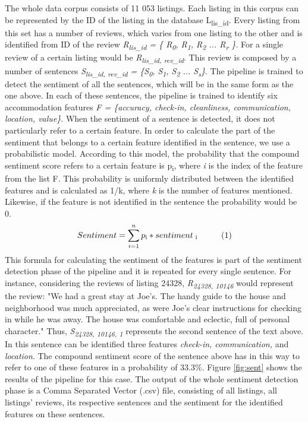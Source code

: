 The whole data corpus consists of 11 053 listings. Each listing in this corpus can be represented by the ID of the listing in the database L\textsubscript{lis\_id}. Every listing from this set has a number of reviews, which varies from one listing to the other and is identified from ID of the review \textit{R\textsubscript{lis\_id} = \{ R\textsubscript{0}, R\textsubscript{1},  R\textsubscript{2} ... R\textsubscript{r} \}}. For a single review of a certain listing would be \textit{R\textsubscript{lis\_id, rev\_id}}. This review is composed by a number of sentences \textit{S\textsubscript{lis\_id, rev\_id} = \{S\textsubscript{0}, S\textsubscript{1}, S\textsubscript{2} ... S\textsubscript{s}\}}. 
The pipeline is trained to detect the sentiment of all the sentences, which will be in the same form as the one above. 
In each of these sentences, the pipeline is trained to identify six accommodation features \textit{F = \{accuracy, check-in, cleanliness, communication, location, value\}}. When the sentiment of a sentence is detected, it does not particularly refer to a certain feature. In order to calculate the part of the sentiment that belongs to a certain feature identified in the sentence, we use a probabilistic model. According to this model, the probability that the compound sentiment score refers to a certain feature is p\textsubscript{i}, where \textit{i} is the index of the feature from the list F. This probability is uniformly distributed between the identified features and is calculated as 1/k, where \textit{k} is the number of features mentioned. Likewise, if the feature is not identified in the sentence the probability would be 0.
%
$$Sentiment = \sum_{i=1}^{n}p\textsubscript{i} *  sentiment\textsubscript{ i} \hspace{1cm} (1)$$ 
%
This formula for calculating the sentiment of the features is part of the sentiment detection phase of the pipeline and it is repeated for every single sentence. For instance, considering the reviews of listing 24328,  \textit{R\textsubscript{24328, 10146}} would represent the review: "We had a great stay at Joe's. The handy guide to the house and neighborhood was much appreciated, as were Joe's clear instructions for checking in while he was away. The house was comfortable and eclectic, full of personal character." Thus, \textit{S\textsubscript{24328, 10146, 1}} represents the second sentence of the text above. In this sentence can be identified three features \textit{check-in, communication,} and \textit{location}. The compound sentiment score of the sentence above has in this way to refer to one of these features in a probability of 33.3\%. Figure \ref{fig:sent} shows the results of the pipeline for this case. The output of the whole sentiment detection phase is a Comma Separated Vector (.csv) file, consisting of all listings, all listings' reviews, its respective sentences and the sentiment for the identified features on these sentences. 
